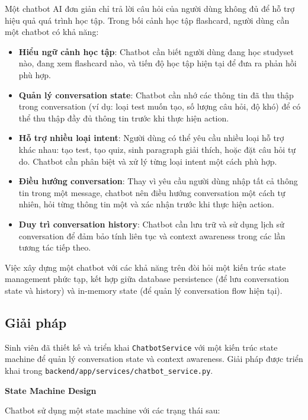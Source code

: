 \documentclass[../DoAn.tex]{subfiles}
\begin{document}
Một chatbot AI đơn giản chỉ trả lời câu hỏi của người dùng không đủ để hỗ trợ hiệu quả quá trình học tập. Trong bối cảnh học tập flashcard, người dùng cần một chatbot có khả năng:

\begin{itemize}
    \item \textbf{Hiểu ngữ cảnh học tập}: Chatbot cần biết người dùng đang học studyset nào, đang xem flashcard nào, và tiến độ học tập hiện tại để đưa ra phản hồi phù hợp.
    \item \textbf{Quản lý conversation state}: Chatbot cần nhớ các thông tin đã thu thập trong conversation (ví dụ: loại test muốn tạo, số lượng câu hỏi, độ khó) để có thể thu thập đầy đủ thông tin trước khi thực hiện action.
    \item \textbf{Hỗ trợ nhiều loại intent}: Người dùng có thể yêu cầu nhiều loại hỗ trợ khác nhau: tạo test, tạo quiz, sinh paragraph giải thích, hoặc đặt câu hỏi tự do. Chatbot cần phân biệt và xử lý từng loại intent một cách phù hợp.
    \item \textbf{Điều hướng conversation}: Thay vì yêu cầu người dùng nhập tất cả thông tin trong một message, chatbot nên điều hướng conversation một cách tự nhiên, hỏi từng thông tin một và xác nhận trước khi thực hiện action.
    \item \textbf{Duy trì conversation history}: Chatbot cần lưu trữ và sử dụng lịch sử conversation để đảm bảo tính liên tục và context awareness trong các lần tương tác tiếp theo.
\end{itemize}

Việc xây dựng một chatbot với các khả năng trên đòi hỏi một kiến trúc state management phức tạp, kết hợp giữa database persistence (để lưu conversation state và history) và in-memory state (để quản lý conversation flow hiện tại).

\subsection{Giải pháp}
\label{subsection:5.3.2}

Sinh viên đã thiết kế và triển khai \texttt{ChatbotService} với một kiến trúc state machine để quản lý conversation state và context awareness. Giải pháp được triển khai trong \texttt{backend/app/services/chatbot\_service.py}.

\textbf{State Machine Design}

Chatbot sử dụng một state machine với các trạng thái sau:
\end{document}
